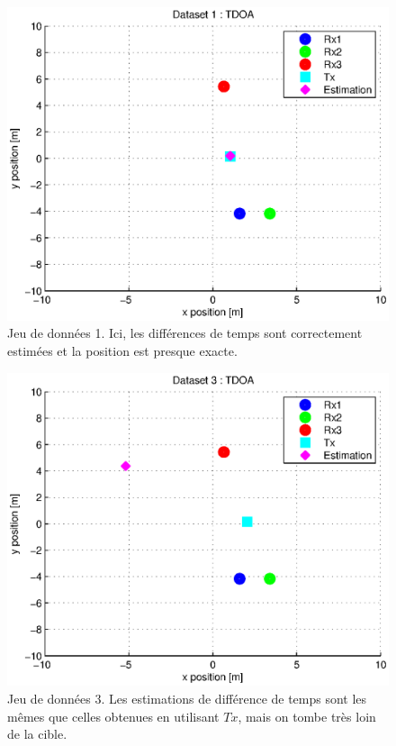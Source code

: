 \documentclass[10pt,a4paper]{article}
\begin{document}
\begin{figure}[h]
\centering
\includegraphics[scale = 0.5]{TDOA1}
\caption{Jeu de données 1. Ici, les différences de temps sont correctement estimées et la position est presque exacte.}
\label{ex1}
\end{figure}
\begin{figure}[h]
\centering
\includegraphics[scale = 0.5]{TDOA3}
\caption{Jeu de données 3. Les estimations de différence de temps sont les mêmes que celles obtenues en utilisant $Tx$, mais on tombe très loin de la cible.}
\label{ex2}
\end{figure}
\end{document}
